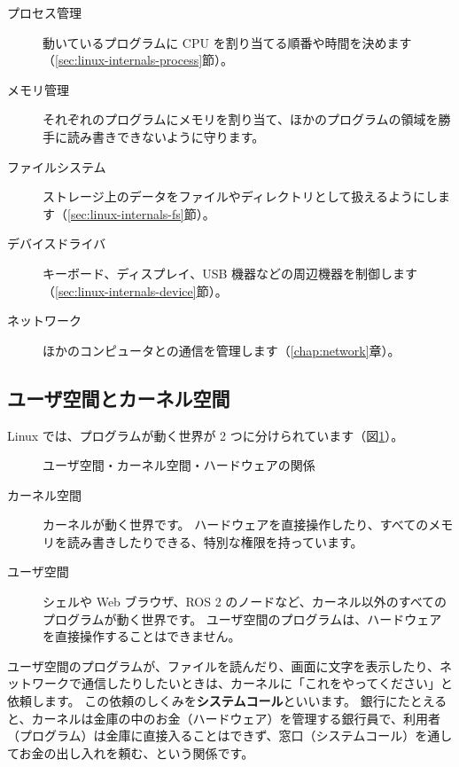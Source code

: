 \begin{description}
  \item[プロセス管理] 動いているプログラムに CPU を割り当てる順番や時間を決めます（\ref{sec:linux-internals-process}節）。
  \item[メモリ管理] それぞれのプログラムにメモリを割り当て、ほかのプログラムの領域を勝手に読み書きできないように守ります。
  \item[ファイルシステム] ストレージ上のデータをファイルやディレクトリとして扱えるようにします（\ref{sec:linux-internals-fs}節）。
  \item[デバイスドライバ] キーボード、ディスプレイ、USB 機器などの周辺機器を制御します（\ref{sec:linux-internals-device}節）。
  \item[ネットワーク] ほかのコンピュータとの通信を管理します（\ref{chap:network}章）。
\end{description}

\subsection{ユーザ空間とカーネル空間}

Linux では、プログラムが動く世界が 2 つに分けられています（図\ref{fig:linux-internals-kernel}）。

\begin{figure}[tb]
  \centering
  
  \caption{ユーザ空間・カーネル空間・ハードウェアの関係}
  \label{fig:linux-internals-kernel}
\end{figure}

\begin{description}
  \item[カーネル空間]
    カーネルが動く世界です。
    ハードウェアを直接操作したり、すべてのメモリを読み書きしたりできる、特別な権限を持っています。
  \item[ユーザ空間]
    シェルや Web ブラウザ、ROS 2 のノードなど、カーネル以外のすべてのプログラムが動く世界です。
    ユーザ空間のプログラムは、ハードウェアを直接操作することはできません。
\end{description}

ユーザ空間のプログラムが、ファイルを読んだり、画面に文字を表示したり、ネットワークで通信したりしたいときは、カーネルに「これをやってください」と依頼します。
この依頼のしくみを\textbf{システムコール}といいます。
銀行にたとえると、カーネルは金庫の中のお金（ハードウェア）を管理する銀行員で、利用者（プログラム）は金庫に直接入ることはできず、窓口（システムコール）を通してお金の出し入れを頼む、という関係です。


